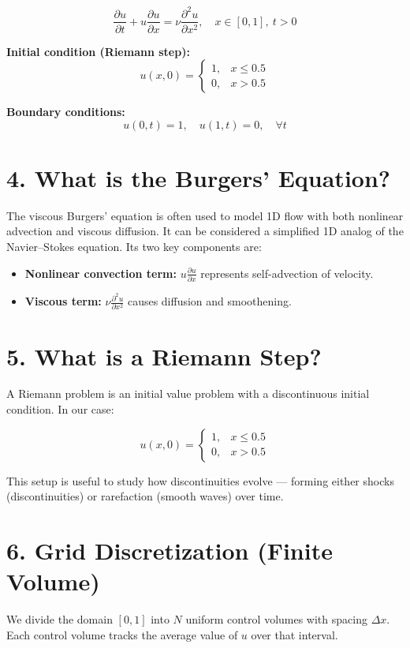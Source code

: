 \documentclass[12pt]{article}
\begin{document}
\[
\frac{\partial u}{\partial t} + u \frac{\partial u}{\partial x} = \nu \frac{\partial^2 u}{\partial x^2}, \quad x \in [0,1],\ t > 0
\]

\textbf{Initial condition (Riemann step):}
\[
u(x, 0) =
\begin{cases}
1, & x \leq 0.5 \\
0, & x > 0.5
\end{cases}
\]

\textbf{Boundary conditions:}
\[
u(0,t) = 1,\quad u(1,t) = 0,\quad \forall t
\]

\section*{4. What is the Burgers’ Equation?}
The viscous Burgers' equation is often used to model 1D flow with both nonlinear advection and viscous diffusion. It can be considered a simplified 1D analog of the Navier–Stokes equation. Its two key components are:
\begin{itemize}
    \item \textbf{Nonlinear convection term: } \( u \frac{\partial u}{\partial x} \) represents self-advection of velocity.
    \item \textbf{Viscous term: } \( \nu \frac{\partial^2 u}{\partial x^2} \) causes diffusion and smoothening.
\end{itemize}

\section*{5. What is a Riemann Step?}
A Riemann problem is an initial value problem with a discontinuous initial condition. In our case:

\[
u(x, 0) = 
\begin{cases}
1, & x \leq 0.5 \\
0, & x > 0.5
\end{cases}
\]

This setup is useful to study how discontinuities evolve — forming either shocks (discontinuities) or rarefaction (smooth waves) over time.

\section*{6. Grid Discretization (Finite Volume)}
We divide the domain \( [0,1] \) into \( N \) uniform control volumes with spacing \( \Delta x \). Each control volume tracks the average value of \( u \) over that interval.
\end{document}
